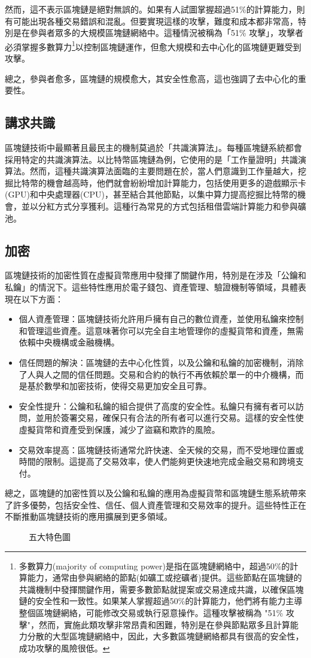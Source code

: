 然而，這不表示區塊鏈是絕對無誤的。如果有人試圖掌握超過51\%的計算能力，則有可能出現各種交易錯誤和混亂。但要實現這樣的攻擊，難度和成本都非常高，特別是在參與者眾多的大規模區塊鏈網絡中。這種情況被稱為「51\% 攻擊」，攻擊者必須掌握多數算力\footnote {多數算力(majority of computing power)是指在區塊鏈網絡中，超過50\%的計算能力，通常由參與網絡的節點(如礦工或挖礦者)提供。這些節點在區塊鏈的共識機制中發揮關鍵作用，需要多數節點就提案或交易達成共識，以確保區塊鏈的安全性和一致性。如果某人掌握超過50\%的計算能力，他們將有能力主導整個區塊鏈網絡，可能修改交易或執行惡意操作。這種攻擊被稱為 "51\% 攻擊"，然而，實施此類攻擊非常昂貴和困難，特別是在參與節點眾多且計算能力分散的大型區塊鏈網絡中，因此，大多數區塊鏈網絡都具有很高的安全性，成功攻擊的風險很低。}以控制區塊鏈運作，但愈大規模和去中心化的區塊鏈更難受到攻擊。

總之，參與者愈多，區塊鏈的規模愈大，其安全性愈高，這也強調了去中心化的重要性。
\subsection{\BB 講求共識}
區塊鏈技術中最顯著且最民主的機制莫過於「共識演算法」。每種區塊鏈系統都會採用特定的共識演算法。以比特幣區塊鏈為例，它使用的是「工作量證明」共識演算法。然而，這種共識演算法面臨的主要問題在於，當人們意識到工作量越大，挖掘比特幣的機會越高時，他們就會紛紛增加計算能力，包括使用更多的遊戲顯示卡(GPU)和中央處理器(CPU)，甚至結合其他節點，以集中算力提高挖掘比特幣的機會，並以分紅方式分享獲利。這種行為常見的方式包括租借雲端計算能力和參與礦池。
\subsection{\WW 加密}
區塊鏈技術的加密性質在虛擬貨幣應用中發揮了關鍵作用，特別是在涉及「公鑰和私鑰」的情況下。這些特性應用於電子錢包、資產管理、驗證機制等領域，具體表現在以下方面：
\begin{itemize}
\item 個人資產管理：區塊鏈技術允許用戶擁有自己的數位資產，並使用私鑰來控制和管理這些資產。這意味著你可以完全自主地管理你的虛擬貨幣和資產，無需依賴中央機構或金融機構。
\item 信任問題的解決：區塊鏈的去中心化性質，以及公鑰和私鑰的加密機制，消除了人與人之間的信任問題。交易和合約的執行不再依賴於單一的中介機構，而是基於數學和加密技術，使得交易更加安全且可靠。
\item 安全性提升：公鑰和私鑰的組合提供了高度的安全性。私鑰只有擁有者可以訪問，並用於簽署交易，確保只有合法的所有者可以進行交易。這樣的安全性使虛擬貨幣和資產受到保護，減少了盜竊和欺詐的風險。
\item 交易效率提高：區塊鏈技術通常允許快速、全天候的交易，而不受地理位置或時間的限制。這提高了交易效率，使人們能夠更快速地完成金融交易和跨境支付。
\end{itemize}
總之，區塊鏈的加密性質以及公鑰和私鑰的應用為虛擬貨幣和區塊鏈生態系統帶來了許多優勢，包括安全性、信任、個人資產管理和交易效率的提升。這些特性正在不斷推動區塊鏈技術的應用擴展到更多領域。
\vspace{0.5cm}
\begin{figure}[h]
    \caption{五大特色圖}
    \label{fig:five-characteristic}
\end{figure}

